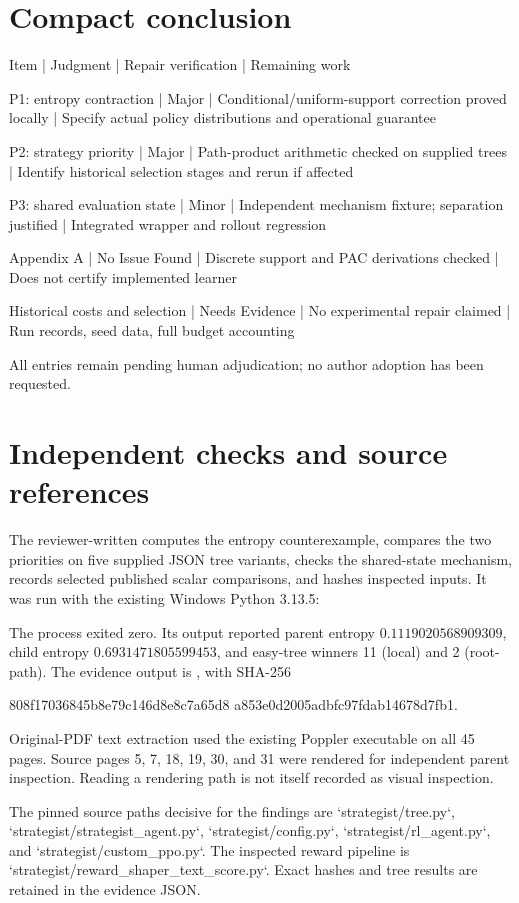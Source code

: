 \documentclass[10pt]{article}
\begin{document}
\section*{Compact conclusion}
Item | Judgment | Repair verification | Remaining work\par
P1: entropy contraction | Major | Conditional/uniform-support correction proved locally | Specify actual policy distributions and operational guarantee\par
P2: strategy priority | Major | Path-product arithmetic checked on supplied trees | Identify historical selection stages and rerun if affected\par
P3: shared evaluation state | Minor | Independent mechanism fixture; separation justified | Integrated wrapper and rollout regression\par
Appendix A | No Issue Found | Discrete support and PAC derivations checked | Does not certify implemented learner\par
Historical costs and selection | Needs Evidence | No experimental repair claimed | Run records, seed data, full budget accounting\par
All entries remain pending human adjudication; no author adoption has been requested.\par
\section*{Independent checks and source references}
The reviewer-written computes the entropy counterexample, compares the two priorities on five supplied JSON tree variants, checks the shared-state mechanism, records selected published scalar comparisons, and hashes inspected inputs. It was run with the existing Windows Python 3.13.5:\par
The process exited zero. Its output reported parent entropy \(0.1119020568909309\), child entropy \(0.6931471805599453\), and easy-tree winners 11 (local) and 2 (root-path). The evidence output is , with SHA-256\par
808f17036845b8e79c146d8e8c7a65d8
a853e0d2005adbfc97fdab14678d7fb1.\par
Original-PDF text extraction used the existing Poppler executable on all 45 pages. Source pages 5, 7, 18, 19, 30, and 31 were rendered for independent parent inspection. Reading a rendering path is not itself recorded as visual inspection.\par
The pinned source paths decisive for the findings are `strategist/tree.py`, `strategist/strategist\_agent.py`, `strategist/config.py`, `strategist/rl\_agent.py`, and `strategist/custom\_ppo.py`. The inspected reward pipeline is `strategist/reward\_shaper\_text\_score.py`. Exact hashes and tree results are retained in the evidence JSON.\par
\end{document}
